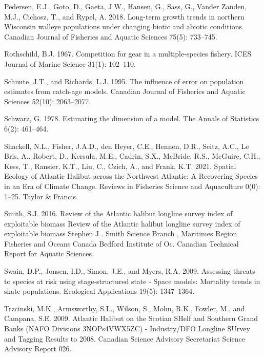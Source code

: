 \documentclass[12pt]{article}\usepackage[]{graphicx}\usepackage[]{color}
\begin{document}
\leavevmode\hypertarget{ref-Pedersen2018}{}%
Pedersen, E.J., Goto, D., Gaeta, J.W., Hansen, G., Sass, G., Vander Zanden, M.J., Cichosz, T., and Rypel, A. 2018. Long-term growth trends in northern Wisconsin walleye populations under changing biotic and abiotic conditions. Canadian Journal of Fisheries and Aquatic Sciences 75(5): 733--745.

\leavevmode\hypertarget{ref-Rothschild1967}{}%
Rothschild, B.J. 1967. Competition for gear in a multiple-species fishery. ICES Journal of Marine Science 31(1): 102--110.

\leavevmode\hypertarget{ref-Schnute1995}{}%
Schnute, J.T., and Richards, L.J. 1995. The influence of error on population estimates from catch-age models. Canadian Journal of Fisheries and Aquatic Sciences 52(10): 2063--2077.

\leavevmode\hypertarget{ref-Schwarz1978}{}%
Schwarz, G. 1978. Estimating the dimension of a model. The Annals of Statistics 6(2): 461--464.

\leavevmode\hypertarget{ref-Shackell2021}{}%
Shackell, N.L., Fisher, J.A.D., den Heyer, C.E., Hennen, D.R., Seitz, A.C., Le Bris, A., Robert, D., Kersula, M.E., Cadrin, S.X., McBride, R.S., McGuire, C.H., Kess, T., Ransier, K.T., Liu, C., Czich, A., and Frank, K.T. 2021. Spatial Ecology of Atlantic Halibut across the Northwest Atlantic: A Recovering Species in an Era of Climate Change. Reviews in Fisheries Science and Aquaculture 0(0): 1--25. Taylor \& Francis.

\leavevmode\hypertarget{ref-Smith2016a}{}%
Smith, S.J. 2016. Review of the Atlantic halibut longline survey index of exploitable biomass Review of the Atlantic halibut longline survey index of exploitable biomass Stephen J . Smith Science Branch , Maritimes Region Fisheries and Oceans Canada Bedford Institute of Oc. Canadian Technical Report for Aquatic Sciences.

\leavevmode\hypertarget{ref-Swain2009}{}%
Swain, D.P., Jonsen, I.D., Simon, J.E., and Myers, R.A. 2009. Assessing threats to species at risk using stage-structured state - Space models: Mortality trends in skate populations. Ecological Applications 19(5): 1347--1364.

\leavevmode\hypertarget{ref-Trzcinski2009}{}%
Trzcinski, M.K., Armsworthy, S.L., Wilson, S., Mohn, R.K., Fowler, M., and Campana, S.E. 2009. Atlantic Halibut on the Scotian SHelf and Southern Grand Banks (NAFO Divisions 3NOPs4VWX5ZC) - Industry/DFO Longline SUrvey and Tagging Results to 2008. Canadian Science Advisory Secretariat Science Advisory Report 026.
\end{document}
